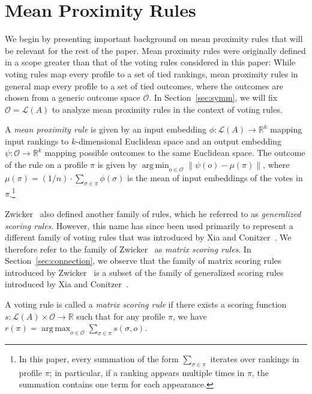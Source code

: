 \documentclass[prodmode,acmec]{ec-acmsmall}
\newcommand{\calL}{{\mathcal{L}}}
\newcommand{\rank}{{\calL(A)}}
\newcommand{\calO}{{\mathcal{O}}}
\DeclareMathOperator*{\argmax}{arg\,max}
\DeclareMathOperator*{\argmin}{arg\,min}
\begin{document}
\section{Mean Proximity Rules}
\label{sec:mpr}

We begin by  presenting important background on mean proximity rules that will be relevant for the rest of the paper. Mean proximity rules were originally defined in a scope greater than that of the voting rules considered in this paper: While voting rules map every profile to a set of tied rankings, mean proximity rules in general map every profile to a set of tied outcomes, where the outcomes are chosen from a generic outcome space $\calO$. In Section~\ref{sec:symm}, we will fix $\calO = \rank$ to analyze mean proximity rules in the context of voting rules. 

\begin{definition}
A \emph{mean proximity rule} is given by an input embedding $\phi: \rank \rightarrow \mathbb{R}^k$ mapping input rankings to $k$-dimensional Euclidean space and an output embedding $\psi: \calO \rightarrow \mathbb{R}^k$ mapping possible outcomes to the same Euclidean space. The outcome of the rule on a profile $\pi$ is given by $\argmin_{o \in \calO} \|\psi(o) - \mu(\pi) \|$, where $\mu(\pi) = (1/n) \cdot \sum_{\sigma \in \pi} \phi(\sigma)$ is the mean of input embeddings of the votes in $\pi$.\footnote{In this paper, every summation of the form $\sum_{\sigma \in \pi}$  iterates over rankings in profile $\pi$; in particular, if a ranking appears multiple times in $\pi$, the summation contains one term for each appearance.}
\end{definition}

\noindent
Zwicker~ also defined another family of rules, which he referred to as \emph{generalized scoring rules}. However, this name has since been used primarily to represent a different family of voting rules that was introduced by Xia and Conitzer~. We therefore refer to the family of Zwicker~ as \emph{matrix scoring rules}. In Section~\ref{sec:connection}, we observe that the family of matrix scoring rules introduced by Zwicker~ is a subset of the family of generalized scoring rules introduced by Xia and Conitzer~. 

\begin{definition}
A voting rule is called a \emph{matrix scoring rule} if there exists a scoring function $s : \rank \times \calO \rightarrow \mathbb{R}$ such that for any profile $\pi$, we have $r(\pi) = \argmax_{o \in \calO} \sum_{\sigma \in \pi} s(\sigma,o)$. 
\end{definition}
\end{document}
